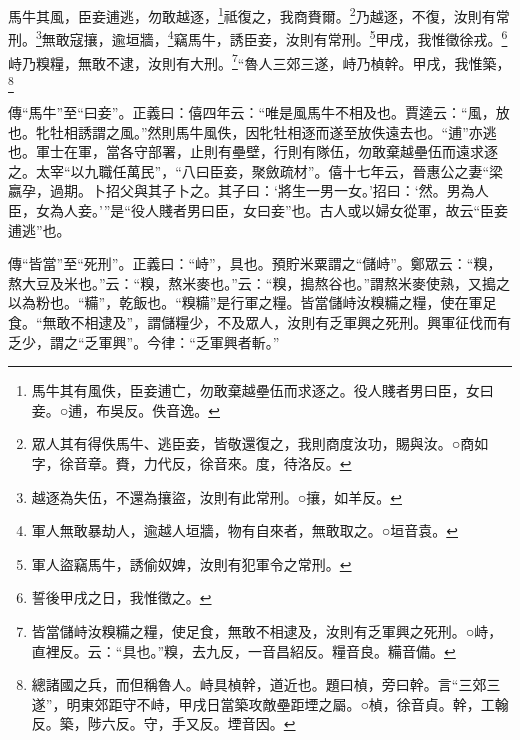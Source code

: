 馬牛其風，臣妾逋逃，勿敢越逐，\footnote{馬牛其有風佚，臣妾逋亡，勿敢棄越壘伍而求逐之。役人賤者男曰臣，女曰妾。○逋，布吳反。佚音逸。}祗復之，我商賚爾。\footnote{眾人其有得佚馬牛、逃臣妾，皆敬還復之，我則商度汝功，賜與汝。○商如字，徐音章。賚，力代反，徐音來。度，待洛反。}乃越逐，不復，汝則有常刑。\footnote{越逐為失伍，不還為攘盜，汝則有此常刑。○攘，如羊反。}無敢寇攘，逾垣牆，\footnote{軍人無敢暴劫人，逾越人垣牆，物有自來者，無敢取之。○垣音袁。}竊馬牛，誘臣妾，汝則有常刑。\footnote{軍人盜竊馬牛，誘偷奴婢，汝則有犯軍令之常刑。}甲戌，我惟徵徐戎。\footnote{誓後甲戌之日，我惟徵之。}峙乃糗糧，無敢不逮，汝則有大刑。\footnote{皆當儲峙汝糗糒之糧，使足食，無敢不相逮及，汝則有乏軍興之死刑。○峙，直裡反。云：“具也。”糗，去九反，一音昌紹反。糧音良。糒音備。}“魯人三郊三遂，峙乃楨幹。甲戌，我惟築，\footnote{總諸國之兵，而但稱魯人。峙具楨幹，道近也。題曰楨，旁曰幹。言“三郊三遂”，明東郊距守不峙，甲戌日當築攻敵壘距堙之屬。○楨，徐音貞。幹，工翰反。築，陟六反。守，手又反。堙音因。}


{\noindent\zhuan{}\fzbyks 傳“馬牛”至“曰妾”。正義曰：僖四年云：“唯是風馬牛不相及也。賈逵云：“風，放也。牝牡相誘謂之風。”然則馬牛風佚，因牝牡相逐而遂至放佚遠去也。“逋”亦逃也。軍士在軍，當各守部署，止則有壘壁，行則有隊伍，勿敢棄越壘伍而遠求逐之。太宰“以九職任萬民”，“八曰臣妾，聚斂疏材”。僖十七年云，晉惠公之妻“梁嬴孕，過期。卜招父與其子卜之。其子曰：‘將生一男一女。’招曰：‘然。男為人臣，女為人妾。’”是“役人賤者男曰臣，女曰妾”也。古人或以婦女從軍，故云“臣妾逋逃”也。 \par}

{\noindent\zhuan{}\fzbyks 傳“皆當”至“死刑”。正義曰：“峙”，具也。預貯米粟謂之“儲峙”。鄭眾云：“糗，熬大豆及米也。”云：“糗，熬米麥也。”云：“糗，搗熬谷也。”謂熬米麥使熟，又搗之以為粉也。“糒”，乾飯也。“糗糒”是行軍之糧。皆當儲峙汝糗糒之糧，使在軍足食。“無敢不相逮及”，謂儲糧少，不及眾人，汝則有乏軍興之死刑。興軍征伐而有乏少，謂之“乏軍興”。今律：“乏軍興者斬。” \par}

